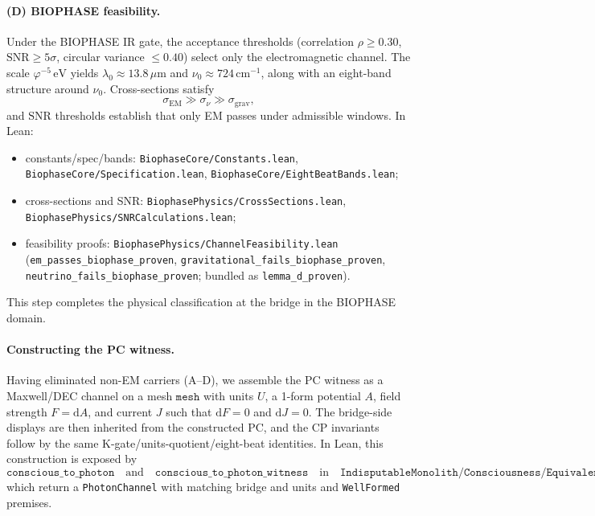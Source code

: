 \documentclass[12pt,a4paper]{article}
\begin{document}
\paragraph{(D) BIOPHASE feasibility.}
Under the BIOPHASE IR gate, the acceptance thresholds (correlation \(\rho\ge 0.30\), \(\mathrm{SNR}\ge 5\sigma\), circular variance \(\le 0.40\)) select only the electromagnetic channel. The scale \(\varphi^{-5}\,\mathrm{eV}\) yields \(\lambda_0\approx 13.8\,\mu\mathrm{m}\) and \(\nu_0\approx 724\,\mathrm{cm}^{-1}\), along with an eight-band structure around \(\nu_0\). Cross-sections satisfy
\[
  \sigma_{\mathrm{EM}}\gg \sigma_{\nu}\gg \sigma_{\mathrm{grav}},
\]
and \(\mathrm{SNR}\) thresholds establish that only EM passes under admissible windows. In Lean:
\begin{itemize}
  \item constants/spec/bands: \texttt{BiophaseCore/Constants.lean}, \texttt{BiophaseCore/Specification.lean}, \texttt{BiophaseCore/EightBeatBands.lean};
  \item cross-sections and SNR: \texttt{BiophasePhysics/CrossSections.lean}, \texttt{BiophasePhysics/SNRCalculations.lean};
  \item feasibility proofs: \texttt{BiophasePhysics/ChannelFeasibility.lean} (\texttt{em\_passes\_biophase\_proven}, \texttt{gravitational\_fails\_biophase\_proven}, \texttt{neutrino\_fails\_biophase\_proven}; bundled as \texttt{lemma\_d\_proven}).
\end{itemize}
This step completes the physical classification at the bridge in the BIOPHASE domain.

\paragraph{Constructing the PC witness.}
Having eliminated non-EM carriers (A--D), we assemble the PC witness as a Maxwell/DEC channel on a mesh \(\texttt{mesh}\) with units \(U\), a 1-form potential \(A\), field strength \(F=\mathrm{d}A\), and current \(J\) such that \(\mathrm{d}F=0\) and \(\mathrm{d}J=0\). The bridge-side displays are then inherited from the constructed PC, and the CP invariants follow by the same K-gate/units-quotient/eight-beat identities. In Lean, this construction is exposed by
\[
  \texttt{conscious\_to\_photon}\quad \text{and}\quad \texttt{conscious\_to\_photon\_witness}
  \quad \text{in}\quad
  \texttt{IndisputableMonolith/Consciousness/Equivalence.lean},
\]
which return a \texttt{PhotonChannel} with matching bridge and units and \texttt{WellFormed} premises.
\end{document}
